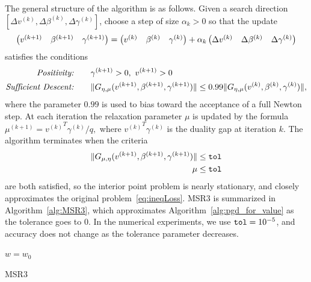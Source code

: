 The general structure of the algorithm is as follows.
Given a search direction
$[\Delta v^{(k)}, \Delta \beta^{(k)}, \Delta \gamma^{(k)}]$, 
choose a step of size $\alpha_k>0$
so that the update
\[
\begin{pmatrix}
v^{(k+1)}& \beta^{(k+1)}& \gamma^{(k+1)}
\end{pmatrix}
=
\begin{pmatrix}
v^{(k)}& \beta^{(k)} &\gamma^{(k)}
\end{pmatrix}
+\alpha_k
\begin{pmatrix}
\Delta v^{(k)} & \Delta\beta^{(k)}& \Delta\gamma^{(k)}
\end{pmatrix}
\]
satisfies the conditions
\[
\begin{aligned}
	\text{\textit{Positivity:}} \qquad & \gamma^{(k+1)} > 0,\ v^{(k+1)} > 0 \\
	\text{\textit{Sufficient Descent:}}\qquad & \| G_\emu(v^{(k+1)}, \beta^{(k+1)}, \gamma^{(k+1)})\| \leq 0.99\|G_\emu(v^{(k)}, \beta^{(k)}, \gamma^{(k)})\|,
\end{aligned}
\]
where the parameter $0.99$ is used to bias toward the acceptance of a full Newton step.
At each iteration the relaxation parameter $\mu$ is updated by the formula 
\( %
    \mu^{(k+1)} = {v^{(k)}}^T\gamma^{(k)}/q,
\) %
where ${v^{(k)}}^T\gamma^{(k)}$ is the duality gap at
iteration $k$. The algorithm terminates when the criteria 
\[
\begin{aligned}
\|G_{\mu,\eta}(v^{(k+1)}, \beta^{(k+1)}, \gamma^{(k+1)})\| &\leq \text{\texttt{tol}}\\
\mu &\leq  \text{\texttt{tol}} 
\end{aligned}
\]
are both satisfied, so the interior point problem is nearly stationary, and closely approximates the original problem~\eqref{eq:ineqLoss}.
MSR3 is summarized in Algorithm~\ref{alg:MSR3}, which approximates Algorithm~\ref{alg:pgd_for_value} as the tolerance goes to $0$. 
In the numerical experiments, we use $\text{\texttt{tol}} = 10^{-5}$, and accuracy does not change as the tolerance parameter decreases.  

\begin{algorithm}[H]
\SetAlgoLined
$w = w_0$ \\
 \caption{\label{alg:MSR3} MSR3}
\end{algorithm}



